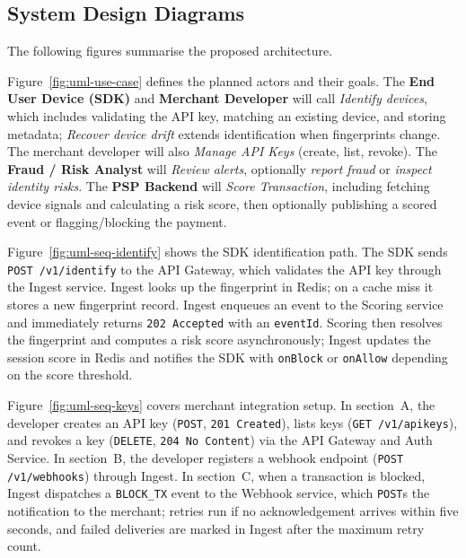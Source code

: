 \subsection{System Design Diagrams}

The following figures summarise the proposed architecture.

\newpage
{}
Figure~\ref{fig:uml-use-case} defines the planned actors and their goals. The \textbf{End User Device (SDK)} and \textbf{Merchant Developer} will call \emph{Identify devices}, which includes validating the API key, matching an existing device, and storing metadata; \emph{Recover device drift} extends identification when fingerprints change. The merchant developer will also \emph{Manage API Keys} (create, list, revoke). The \textbf{Fraud / Risk Analyst} will \emph{Review alerts}, optionally \emph{report fraud} or \emph{inspect identity risks}. The \textbf{PSP Backend} will \emph{Score Transaction}, including fetching device signals and calculating a risk score, then optionally publishing a scored event or flagging/blocking the payment.
\newpage

Figure~\ref{fig:uml-seq-identify} shows the SDK identification path. The SDK sends \texttt{POST /v1/identify} to the API Gateway, which validates the API key through the Ingest service. Ingest looks up the fingerprint in Redis; on a cache miss it stores a new fingerprint record. Ingest enqueues an event to the Scoring service and immediately returns \texttt{202 Accepted} with an \texttt{eventId}. Scoring then resolves the fingerprint and computes a risk score asynchronously; Ingest updates the session score in Redis and notifies the SDK with \texttt{onBlock} or \texttt{onAllow} depending on the score threshold.
\newpage

Figure~\ref{fig:uml-seq-keys} covers merchant integration setup. In section~A, the developer creates an API key (\texttt{POST}, \texttt{201 Created}), lists keys (\texttt{GET /v1/apikeys}), and revokes a key (\texttt{DELETE}, \texttt{204 No Content}) via the API Gateway and Auth Service. In section~B, the developer registers a webhook endpoint (\texttt{POST /v1/webhooks}) through Ingest. In section~C, when a transaction is blocked, Ingest dispatches a \texttt{BLOCK\_TX} event to the Webhook service, which \texttt{POST}s the notification to the merchant; retries run if no acknowledgement arrives within five seconds, and failed deliveries are marked in Ingest after the maximum retry count.
\newpage

